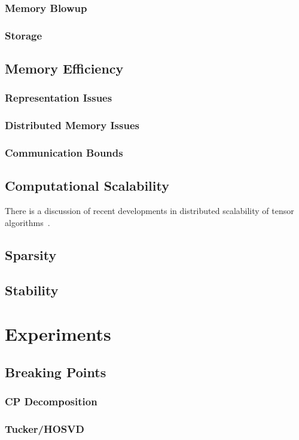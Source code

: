 \documentclass[10pt]{article}
\begin{document}
\subsubsection{Memory Blowup}
\subsubsection{Storage}
\subsection{Memory Efficiency}
\subsubsection{Representation Issues}
\subsubsection{Distributed Memory Issues}
\subsubsection{Communication Bounds}
\subsection{Computational Scalability}
There is a discussion of recent developments in distributed scalability of tensor algorithms~\cite{falbull}.
\subsection{Sparsity}
\subsection{Stability}
\section{Experiments}
\subsection{Breaking Points}
\subsubsection{CP Decomposition}
\subsubsection{Tucker/HOSVD}
\end{document}
